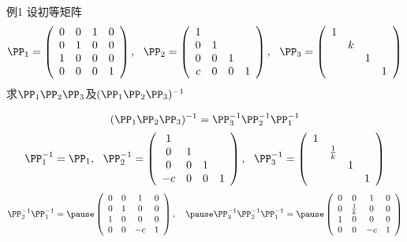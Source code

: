 \begin{frame}
  \begin{footnotesize}
    \begin{exampleblock}{例1}
      设初等矩阵
      $$
      \PP_1 = \left(
      \begin{array}{cccc}
        0&0&1&0 \\
        0&1&0&0 \\
        1&0&0&0 \\
        0&0&0&1
      \end{array}
      \right), ~~
      \PP_2 = \left(
      \begin{array}{cccc}
        1& & &  \\
        0&1& &  \\
        0&0&1& \\
        c&0&0&1
      \end{array}
      \right), ~~
      \PP_3 = \left(
      \begin{array}{cccc}
        1& & &  \\
        &k& &  \\
        & &1& \\
        & & &1
      \end{array}
      \right)
      $$
      求$\PP_1\PP_2\PP_3$及$(\PP_1\PP_2\PP_3)^{-1}$
    \end{exampleblock}
    \pause 
    $$
    (\PP_1\PP_2\PP_3)^{-1} = \PP_3^{-1}\PP_2^{-1}\PP_1^{-1}
    $$
    \pause
    $$
    \PP_1^{-1} = \PP_1, ~~
    \PP_2^{-1} = \left(
    \begin{array}{cccc}
      1& & &  \\
      0&1& &  \\
      0&0&1& \\
      -c&0&0&1
    \end{array}
    \right), ~~
    \PP_3^{-1} = \left(
    \begin{array}{cccc}
      1& & &  \\
      &\frac1k& &  \\
      & &1& \\
      & & &1
    \end{array}
    \right)
    $$    
    \pause 
    $$
    \PP_2^{-1}\PP_1^{-1} =  \pause \left(
    \begin{array}{cccc}
      0&0&1&0 \\
      0&1&0&0 \\
      1&0&0&0 \\
      0&0&-c&1
    \end{array}
    \right), \quad \pause 
    \PP_3^{-1}\PP_2^{-1}\PP_1^{-1} = \pause \left(
    \begin{array}{cccc}
      0&0&1&0 \\
      0&\frac1k&0&0 \\
      1&0&0&0 \\
      0&0&-c&1
    \end{array}
    \right)
    $$
  \end{footnotesize}
\end{frame}



